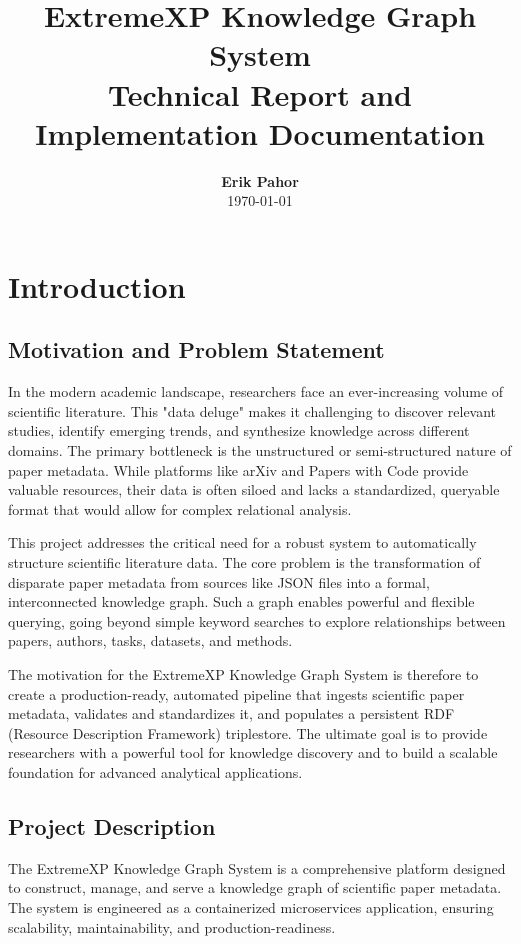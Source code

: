 \documentclass[12pt,a4paper]{article}
\title{
    \vspace{2cm}
    \Huge{\textbf{ExtremeXP Knowledge Graph System}} \\
    \vspace{1cm}
    \large{Technical Report and Implementation Documentation}
}
\author{
    \textbf{Erik Pahor} \\
    \vspace{0.5cm}
    \today
}
\date{}
\begin{document}
\maketitle
\thispagestyle{empty}

\newpage
\tableofcontents
\newpage


\section{Introduction}
\subsection{Motivation and Problem Statement}

In the modern academic landscape, researchers face an ever-increasing volume of scientific literature. This "data deluge" makes it challenging to discover relevant studies, identify emerging trends, and synthesize knowledge across different domains. The primary bottleneck is the unstructured or semi-structured nature of paper metadata. While platforms like arXiv and Papers with Code provide valuable resources, their data is often siloed and lacks a standardized, queryable format that would allow for complex relational analysis.

This project addresses the critical need for a robust system to automatically structure scientific literature data. The core problem is the transformation of disparate paper metadata from sources like JSON files into a formal, interconnected knowledge graph. Such a graph enables powerful and flexible querying, going beyond simple keyword searches to explore relationships between papers, authors, tasks, datasets, and methods.

The motivation for the ExtremeXP Knowledge Graph System is therefore to create a production-ready, automated pipeline that ingests scientific paper metadata, validates and standardizes it, and populates a persistent RDF (Resource Description Framework) triplestore. The ultimate goal is to provide researchers with a powerful tool for knowledge discovery and to build a scalable foundation for advanced analytical applications.

\subsection{Project Description}

The ExtremeXP Knowledge Graph System is a comprehensive platform designed to construct, manage, and serve a knowledge graph of scientific paper metadata. The system is engineered as a containerized microservices application, ensuring scalability, maintainability, and production-readiness.
\end{document}
